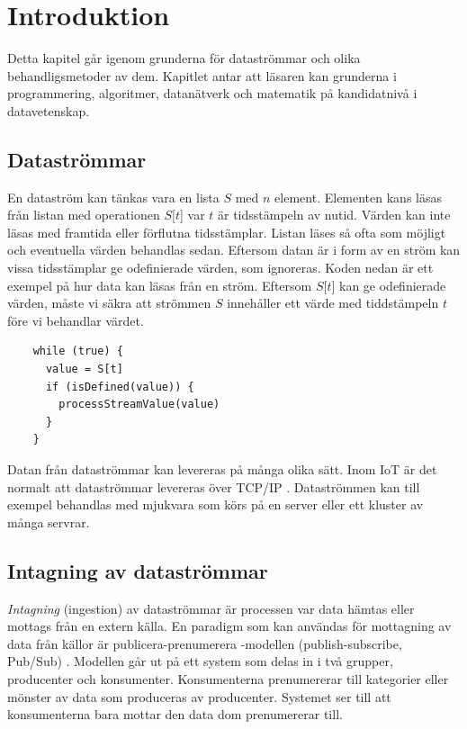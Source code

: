 \chapter{Introduktion}

Detta kapitel går igenom grunderna för dataströmmar och olika behandligsmetoder av dem. Kapitlet antar att
läsaren kan grunderna i programmering, algoritmer, datanätverk och matematik på kandidatnivå i datavetenskap.

\section{Dataströmmar}

En dataström kan tänkas vara en lista $S$ med $n$ element. Elementen kans läsas från listan med operationen $S$[$t$] 
var $t$ är tidsstämpeln av nutid. Värden kan inte läsas med framtida eller förflutna tidsstämplar. Listan läses
så ofta som möjligt och eventuella värden behandlas sedan. Eftersom datan är i form av en ström kan vissa 
tidsstämplar ge odefinierade värden, som ignoreras. Koden nedan är ett exempel på hur data kan läsas från en
ström. Eftersom $S$[$t$] kan ge odefinierade värden, måste vi säkra att strömmen $S$ innehåller ett värde med
tiddstämpeln $t$ före vi behandlar värdet.

\begin{verbatim}
    while (true) {
      value = S[t]
      if (isDefined(value)) {
        processStreamValue(value)
      }
    }
\end{verbatim}

Datan från dataströmmar kan levereras på många olika sätt. Inom IoT är det normalt att dataströmmar 
levereras över TCP/IP \citep{shang2016challenges}. Dataströmmen kan till exempel behandlas med mjukvara som körs på en server eller ett kluster av många servrar.

\section{Intagning av dataströmmar}

\textit{Intagning} (ingestion) av dataströmmar är processen var data hämtas eller mottags från en extern källa. En paradigm
som kan användas för mottagning av data från källor är publicera-prenumerera -modellen (publish-subscribe, Pub/Sub) \citep{eugster2003many}.
Modellen går ut på ett system som delas in i två grupper, producenter och konsumenter. Konsumenterna prenumererar till kategorier eller mönster
av data som produceras av producenter. Systemet ser till att konsumenterna bara mottar den data dom prenumererar till.

